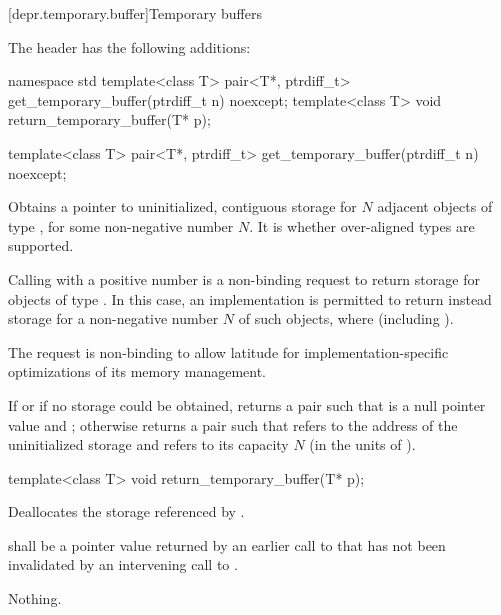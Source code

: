 [depr.temporary.buffer]{Temporary buffers}

\pnum
The header
%
 has the following additions:

\begin{codeblock}
namespace std {
  template<class T>
    pair<T*, ptrdiff_t> get_temporary_buffer(ptrdiff_t n) noexcept;
  template<class T>
    void return_temporary_buffer(T* p);
}
\end{codeblock}

%
\begin{itemdecl}
template<class T>
  pair<T*, ptrdiff_t> get_temporary_buffer(ptrdiff_t n) noexcept;
\end{itemdecl}

\begin{itemdescr}
\pnum
\effects
Obtains a pointer to uninitialized, contiguous storage for $N$ adjacent
objects of type , for some non-negative number $N$.
It is  whether over-aligned types are
supported.

\pnum
\remarks
Calling  with a positive number  is
a non-binding request to return storage for  objects of type .
In this case, an implementation is permitted to return instead storage for
a non-negative number $N$ of such objects,
where  (including ).
\begin{note} The request is non-binding to allow latitude for
implementation-specific optimizations of its memory management. \end{note}

\pnum
\returns
If  or if no storage could be obtained,
returns a pair  such that
 is a null pointer value and ;
otherwise returns a pair  such that
 refers to the address of the uninitialized storage and
 refers to its capacity $N$ (in the units of ).
\end{itemdescr}

%
\begin{itemdecl}
template<class T> void return_temporary_buffer(T* p);
\end{itemdecl}

\begin{itemdescr}
\pnum
\effects
Deallocates the storage referenced by .

\pnum
\requires
{} shall be a pointer value returned by an earlier call to
 that has not been invalidated by
an intervening call to .

\pnum
\throws
Nothing.
\end{itemdescr}

